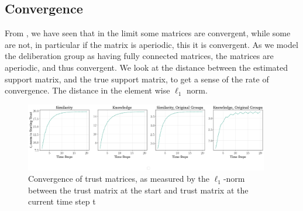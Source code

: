 \documentclass[11pt, oneside, dvipsnames]{Thesis} %
\begin{document}
%


\subsection{Convergence}

From , we have seen that in the limit some matrices are
convergent, while some are not, in particular if the matrix is aperiodic, this
it is convergent. As we model the deliberation group as having fully connected
matrices, the matrices are aperiodic, and thus convergent. We look at the
distance between the estimated support matrix, and the true support matrix, to
get a sense of the rate of convergence. The distance in the element wise
$\ell_1$ norm.

\begin{figure}
	\begin{center}
		\includegraphics[width=0.95\textwidth]{Figures/convergence_groups.png}
	\end{center}
	\caption{Convergence of trust matrices, as measured by the $\ell_1$-norm between the trust matrix at the start and  trust matrix at the current time step
		t}\label{fig:convergence_big}
\end{figure}
\end{document}
